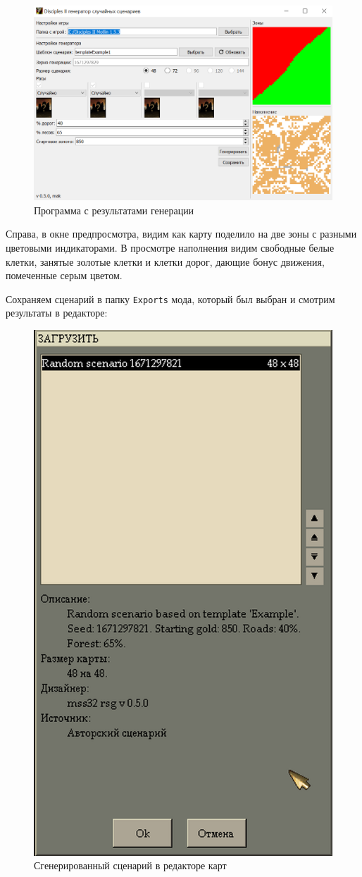 \begin{figure}[H]
\center
\includegraphics[width=.8\linewidth]{docImages/scenarioGenerated.png}
\caption{Программа с результатами генерации}
\end{figure}

Справа, в окне предпросмотра, видим как карту поделило на две зоны с разными цветовыми индикаторами. В просмотре наполнения видим свободные белые клетки, занятые золотые клетки и клетки дорог, дающие бонус движения, помеченные серым цветом.

Сохраняем сценарий в папку \texttt{Exports} мода, который был выбран и смотрим результаты в редакторе:

\begin{figure}[H]
\center
\includegraphics[width=.48\linewidth]{docImages/scenarioInEditor.png}
\caption{Сгенерированный сценарий в редакторе карт}
\end{figure}

